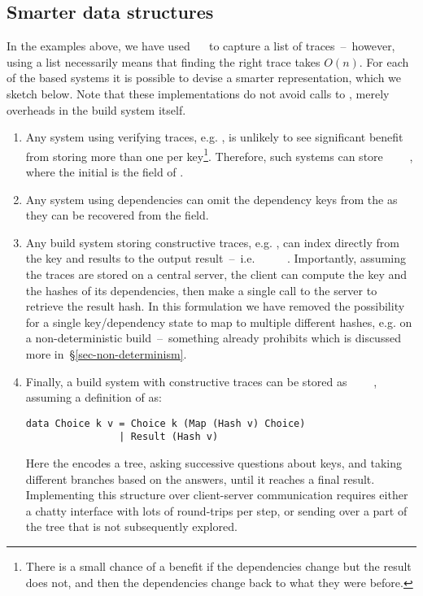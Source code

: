 \subsection{Smarter \hs{[Trace]} data structures}\label{sec-smart-traces}

In the examples above, we have used \hs{[Trace}~~\hs{v]} to capture a list
of traces~--~however, using a list necessarily means that finding the right trace
takes $O(n)$. For each of the  based systems it is possible to devise
a smarter representation, which we sketch below. Note that these implementations
do not avoid calls to , merely overheads in the build system itself.

\begin{enumerate}
\item Any system using verifying traces, e.g. \Shake, is unlikely to see significant benefit from storing more than one  per key\footnote{There is a small chance of a benefit if the dependencies change but the result does not, and then the dependencies change back to what they were before.}. Therefore, such systems can store ~~~~, where the initial  is the  field of .
\item Any system using  dependencies can omit the dependency keys from the  as they can be recovered from the  field.
\item Any  build system storing constructive traces, e.g. \Bazel, can index directly from the key and results to the output result~--~i.e. ~~\hs{[Hash}~\hs{v])}~~. Importantly, assuming the traces are stored on a central server, the client can compute the key and the hashes of its dependencies, then make a single call to the server to retrieve the result hash. In this formulation we have removed the possibility for a single key/dependency state to map to multiple different hashes, e.g. on a non-deterministic build~--~something \Bazel already prohibits which is discussed more in~\S\ref{sec-non-determinism}.
\item Finally, a  build system with constructive traces can be stored as ~~~~, assuming a definition of  as:
\begin{verbatim}
data Choice k v = Choice k (Map (Hash v) Choice)
                | Result (Hash v)
\end{verbatim}
Here the  encodes a tree, asking successive questions about keys, and taking different branches based on the answers, until it reaches a final result. Implementing this structure over client-server communication requires either a chatty interface with lots of round-trips per  step, or sending over a part of the tree that is not subsequently explored.
\end{enumerate}
